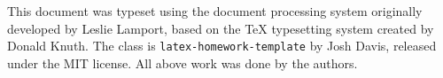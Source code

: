 \documentclass{article}
\newcommand{\enterProblemHeader}[1]{
    \nobreak\extramarks{}{Problem \arabic{#1} continued on next page\ldots}\nobreak{}
    \nobreak\extramarks{Problem \arabic{#1} (continued)}{Problem \arabic{#1} continued on next page\ldots}\nobreak{}
}
\newcommand{\exitProblemHeader}[1]{
    \nobreak\extramarks{Problem \arabic{#1} (continued)}{Problem \arabic{#1} continued on next page\ldots}\nobreak{}
    \stepcounter{#1}
    \nobreak\extramarks{Problem \arabic{#1}}{}\nobreak{}
}
\newcounter{partCounter}
\newcounter{homeworkProblemCounter}
\newenvironment{homeworkProblem}[1][-1]{
    \ifnum#1>0
        \setcounter{homeworkProblemCounter}{#1}
    \fi
    \section{Problem \arabic{homeworkProblemCounter}}
    \setcounter{partCounter}{1}
    \enterProblemHeader{homeworkProblemCounter}
}{
    \exitProblemHeader{homeworkProblemCounter}
}
\newcommand{\dx}{\mathrm{d}x}
\begin{document}
%
%
%
%
%
%
%
%

\begin{colophon}
    This document was typeset using the \LaTeXe{} document processing system
    originally developed by Leslie Lamport, based on the \TeX{} typesetting system
    created by Donald Knuth.
    The class is \texttt{latex-homework-template} by Josh Davis,
    released under the MIT license.
    All above work was done by the authors.

\end{colophon}
\end{document}
